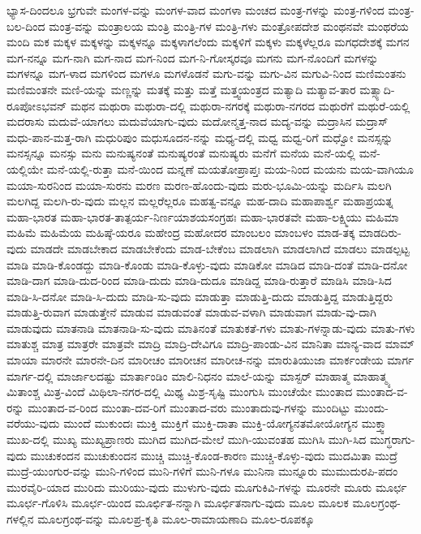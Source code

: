ಭ್ಯಾಸ-ದಿಂದಲೂ
ಭ್ರಗುವೇ
ಮಂಗಳ-ವನ್ನು
ಮಂಗಳ-ವಾದ
ಮಂಗಳಾ
ಮಂಚದ
ಮಂತ್ರ-ಗಳನ್ನು
ಮಂತ್ರ-ಗಳಿಂದ
ಮಂತ್ರ-ಬಲ-ದಿಂದ
ಮಂತ್ರ-ವನ್ನು
ಮಂತ್ರಾಲಯ
ಮಂತ್ರಿ
ಮಂತ್ರಿ-ಗಳ
ಮಂತ್ರಿ-ಗಳು
ಮಂತ್ರೋಪದೇಶ
ಮಂಥನವೇ
ಮಂಥರೆಯ
ಮಂದಿ
ಮಕ
ಮಕ್ಕಳ
ಮಕ್ಕಳನ್ನು
ಮಕ್ಕಳನ್ನೂ
ಮಕ್ಕಳಾಗಲೆಂದು
ಮಕ್ಕಳಿಗೆ
ಮಕ್ಕಳು
ಮಕ್ಕಳೆಲ್ಲರೂ
ಮಗಧದೇಶಕ್ಕೆ
ಮಗನ
ಮಗ-ನನ್ನೂ
ಮಗ-ನಾಗಿ
ಮಗ-ನಾದ
ಮಗ-ನಿಂದ
ಮಗ-ನಿ-ಗೋಸ್ಕರವೂ
ಮಗನು
ಮಗ-ನೊಂದಿಗೆ
ಮಗಳನ್ನು
ಮಗಳನ್ನೂ
ಮಗ-ಳಾದ
ಮಗಳಿಂದ
ಮಗಳೂ
ಮಗಳೊಡನೆ
ಮಗು-ವನ್ನು
ಮಗು-ವಿನ
ಮಗುವಿ-ನಿಂದ
ಮಣಿಮಂತನು
ಮಣಿಮಂತನೇ
ಮಣಿ-ಯನ್ನು
ಮಣ್ಣನ್ನು
ಮತಕ್ಕೆ
ಮತ್ತು
ಮತ್ತೆ
ಮತ್ತ್ವಯಂತ್ರದ
ಮತ್ಯಾದಿ
ಮತ್ಯಾವ-ತಾರ
ಮತ್ಸ್ಯಾದಿ-ರೂಪೋಽಭವನ್
ಮಥನ
ಮಥುರಾ
ಮಥುರಾ-ದಲ್ಲಿ
ಮಥುರಾ-ನಗರಕ್ಕೆ
ಮಥುರಾ-ನಗರದ
ಮಥುರೆಗೆ
ಮಥುರೆ-ಯಲ್ಲಿ
ಮದರಾಸು
ಮದುವೆ-ಯಾಗಲು
ಮದುವೆಯಾಗು-ವುದು
ಮದೋನ್ಮತ್ತ-ನಾದ
ಮದ್ಯ-ವನ್ನು
ಮದ್ರಾಸಿನ
ಮದ್ರಾಸ್
ಮಧು-ಪಾನ-ಮತ್ತ-ರಾಗಿ
ಮಧುರಿಪುಂ
ಮಧುಸೂದನ-ನನ್ನು
ಮಧ್ಯ-ದಲ್ಲಿ
ಮಧ್ವ
ಮಧ್ವ-ರಿಗೆ
ಮಧ್ವೋ
ಮನಸ್ಸನ್ನು
ಮನಸ್ಸನ್ನೂ
ಮನಸ್ಸು
ಮನು
ಮನುಷ್ಯನಂತೆ
ಮನುಷ್ಯರಂತೆ
ಮನುಷ್ಯರು
ಮನೆಗೆ
ಮನೆಯ
ಮನೆ-ಯಲ್ಲಿ
ಮನೆ-ಯಲ್ಲಿಯೇ
ಮನೆ-ಯಲ್ಲಿ-ರುತ್ತಾ
ಮನೆ-ಯಿಂದ
ಮನ್ನಣೆ
ಮಯತೋಪ್ರಾಪ್ತಃ
ಮಯ-ನಿಂದ
ಮಯನು
ಮಯ-ವಾಗಿಯೂ
ಮಯಾ-ಸುರನಿಂದ
ಮಯಾ-ಸುರನು
ಮರಣ
ಮರಣ-ಹೊಂದು-ವುದು
ಮರು-ಭೂಮಿ-ಯನ್ನು
ಮರ್ದಿಸಿ
ಮಲಗಿ
ಮಲಗಿದ್ದ
ಮಲಗಿ-ರು-ವುದು
ಮಲ್ಲನ
ಮಲ್ಲರೆಲ್ಲರೂ
ಮಹತ್ವ-ವನ್ನೂ
ಮಹ-ದಾದಿ
ಮಹಾಪಾರ್ಶ್ವ
ಮಹಾಪ್ರಯತ್ನ
ಮಹಾ-ಭಾರತ
ಮಹಾ-ಭಾರತ-ತಾತ್ಪರ್ಯ-ನಿರ್ಣಯಾಶಯಸಂಗ್ರಹಃ
ಮಹಾ-ಭಾರತವೇ
ಮಹಾ-ಲಕ್ಷ್ಮಿಯು
ಮಹಿಮಾ
ಮಹಿಮೆ
ಮಹಿಮೆಯ
ಮಹಿಷ್ಠೆ-ಯರೂ
ಮಹೇಂದ್ರ
ಮಹೋದರ
ಮಾಂಬಲಂ
ಮಾಂಬಳಂ
ಮಾಡ-ತಕ್ಕ
ಮಾಡದಿರು-ವುದು
ಮಾಡದೇ
ಮಾಡಬೇಕಾದ
ಮಾಡಬೇಕೆಂದು
ಮಾಡ-ಬೇಕೆಂಬ
ಮಾಡಲಾಗಿ
ಮಾಡಲಾಗಿದೆ
ಮಾಡಲು
ಮಾಡಲ್ಪಟ್ಟ
ಮಾಡಿ
ಮಾಡಿ-ಕೊಂಡದ್ದು
ಮಾಡಿ-ಕೊಂಡು
ಮಾಡಿ-ಕೊಳ್ಳು-ವುದು
ಮಾಡಿಕೋ
ಮಾಡಿದ
ಮಾಡಿ-ದಂತೆ
ಮಾಡಿ-ದನೋ
ಮಾಡಿ-ದಾಗ
ಮಾಡಿ-ದುದ-ರಿಂದ
ಮಾಡಿ-ದುದು
ಮಾಡಿ-ದುದೂ
ಮಾಡಿದ್ದ
ಮಾಡಿ-ರುತ್ತಾರೆ
ಮಾಡಿಸಿ
ಮಾಡಿ-ಸಿದ
ಮಾಡಿ-ಸಿ-ದನೋ
ಮಾಡಿ-ಸಿ-ದುದು
ಮಾಡಿ-ಸು-ವುದು
ಮಾಡುತ್ತಾ
ಮಾಡುತ್ತಿ-ದುದು
ಮಾಡುತ್ತಿದ್ದ
ಮಾಡುತ್ತಿದ್ದರು
ಮಾಡುತ್ತಿ-ರುವಾಗ
ಮಾಡುತ್ತೇನೆ
ಮಾಡುವ
ಮಾಡುವಂತೆ
ಮಾಡುವ-ವಳಾಗಿ
ಮಾಡುವಾಗ
ಮಾಡು-ವು-ದಾಗಿ
ಮಾಡುವುದು
ಮಾತನಾಡಿ
ಮಾತನಾಡಿ-ಸು-ವುದು
ಮಾತಿನಂತೆ
ಮಾತುಕತೆ-ಗಳು
ಮಾತು-ಗಳನ್ನಾಡು-ವುದು
ಮಾತು-ಗಳು
ಮಾತುಶ್ಚ
ಮಾತ್ರ
ಮಾತ್ರರೇ
ಮಾತ್ರವೇ
ಮಾದ್ರಿ
ಮಾದ್ರಿ-ದೇವಿಗೂ
ಮಾದ್ರಿ-ಪಾಂಡು-ವಿನ
ಮಾನಿತಾ
ಮಾನ್ಯ-ವಾದ
ಮಾಮ್
ಮಾಯಾ
ಮಾರನೇ
ಮಾರನೇ-ದಿನ
ಮಾರೀಚಂ
ಮಾರೀಚನ
ಮಾರೀಚ-ನನ್ನು
ಮಾರುತಿಯುಜಾ
ಮಾರ್ಕಂಡೇಯ
ಮಾರ್ಗ
ಮಾರ್ಗ-ದಲ್ಲಿ
ಮಾರ್ಜಾಲದಷ್ಟು
ಮಾರ್ತಾಂಡಿಂ
ಮಾಲಿ-ನಿಧನಂ
ಮಾಲೆ-ಯನ್ನು
ಮಾಸ್ಟರ್
ಮಾಹಾತ್ಮ
ಮಾಹಾತ್ಮ್ಯ
ಮಿತಾಂಶ್ಚ
ಮಿತ್ರ-ವಿಂದೆ
ಮಿಥಿಲಾ-ನಗರ-ದಲ್ಲಿ
ಮಿಥ್ಯ
ಮಿಶ್ರ-ಸೃಷ್ಟಿ
ಮುಂಗುಸಿ
ಮುಂಚೆಯೇ
ಮುಂತಾದ
ಮುಂತಾದ-ವ-ರನ್ನು
ಮುಂತಾದ-ವ-ರಿಂದ
ಮುಂತಾ-ದವ-ರಿಗೆ
ಮುಂತಾದ-ವರು
ಮುಂತಾದುವು-ಗಳನ್ನು
ಮುಂದಿಟ್ಟು
ಮುಂದು-ವರೆಯು-ವುದು
ಮುಂದೆ
ಮುಕುಂದಃ
ಮುಕ್ತಿ
ಮುಕ್ತಿಗೆ
ಮುಕ್ತಿ-ದಾತಾ
ಮುಕ್ತಿ-ಯೋಗ್ಯನತಮೋಯೋಗ್ಯನ
ಮುಕ್ತ್ವಾ
ಮುಖ-ದಲ್ಲಿ
ಮುಖ್ಯ
ಮುಖ್ಯಪ್ರಾಣರು
ಮುಗಿದ
ಮುಗಿದ-ಮೇಲೆ
ಮುಗಿ-ಯುವಂತಹ
ಮುಗಿಸಿ
ಮುಗಿ-ಸಿದ
ಮುಗ್ಧರಾಗು-ವುದು
ಮುಚುಕಂದನ
ಮುಚುಕುಂದನ
ಮುಚ್ಚಿ
ಮುಚ್ಚಿ-ಕೊಂಡ-ಕಾರಣ
ಮುಚ್ಚಿ-ಕೊಳ್ಳು-ವುದು
ಮುದಮಿತಾ
ಮುದ್ರೆ
ಮುದ್ರೆ-ಯುಂಗುರ-ವನ್ನು
ಮುನಿ-ಗಳಿಂದ
ಮುನಿ-ಗಳಿಗೆ
ಮುನಿ-ಗಳೂ
ಮುನಿನಾ
ಮುನ್ನೂರು
ಮುಮುದುರಪಿ-ಪದಂ
ಮುರವೈರಿ-ಯಾದ
ಮುರಿದು
ಮುರಿಯು-ವುದು
ಮುಳುಗು-ವುದು
ಮೂಗುಕಿವಿ-ಗಳನ್ನು
ಮೂರನೇ
ಮೂರು
ಮೂರ್ಛ
ಮೂರ್ಛ-ಗೊಳಿಸಿ
ಮೂರ್ಛ-ಯಿಂದ
ಮೂರ್ಛಿತ-ನನ್ನಾಗಿ
ಮೂರ್ಛಿತನಾಗು-ವುದು
ಮೂಲ
ಮೂಲಕ
ಮೂಲಗ್ರಂಥ-ಗಳಲ್ಲಿನ
ಮೂಲಗ್ರಂಥ-ವನ್ನು
ಮೂಲಪ್ರ-ಕೃತಿ
ಮೂಲ-ರಾಮಾಯಣಾದಿ
ಮೂಲ-ರೂಪಕ್ಕೂ
